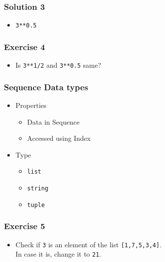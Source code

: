 \documentclass[17pt,compress]{beamer}
\begin{document}
\begin{frame}
\frametitle{Solution 3}
\label{sec-8}

\begin{itemize}
\item \texttt{3**0.5}
\end{itemize}
\end{frame}
\begin{frame}
\frametitle{Exercise 4}
\label{sec-9}

\begin{itemize}
\item Is \texttt{3**1/2} and \texttt{3**0.5} same?
\end{itemize}
\end{frame}
\begin{frame}
\frametitle{Sequence Data types}
\label{sec-10}
\begin{itemize}

\item Properties\\\pause
\label{sec-10_1}%
\begin{itemize}
\item Data in Sequence
\item Accessed using Index\pause
\end{itemize}

\item Type\\\pause
\label{sec-10_2}%
\begin{itemize}
\item \texttt{list}
\item \texttt{string}
\item \texttt{tuple}
\end{itemize}

\end{itemize} %
\end{frame}
\begin{frame}
\frametitle{Exercise 5}
\label{sec-11}

\begin{itemize}
\item Check if \texttt{3} is an element of the list \texttt{[1,7,5,3,4]}.\\ In case it is, 
change it to \texttt{21}.
\end{itemize}

\end{frame}
\end{document}

